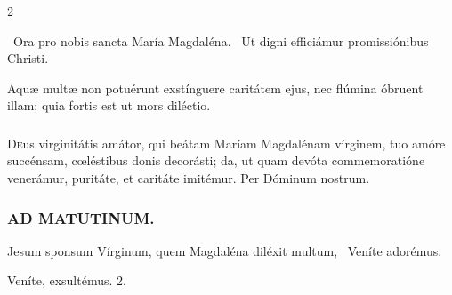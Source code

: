 \documentclass[9pt,twoside]{extarticle}
\begin{document}
\begin{multicols}{2}
{\begin{tightlist}{}
\item {}~Ora pro nobis sancta María Magdaléna. ~Ut digni efficiámur promissiónibus Christi.
\item {} Aquæ multæ non potuérunt exstínguere caritátem ejus, nec flúmina óbruent illam; quia fortis est ut mors diléctio.
\end{tightlist}

\subsubsection*{\center {}}
\lettrine{D}eus virginitátis amátor, qui beátam Maríam Magdalénam vírginem, tuo amóre succénsam, cœléstibus donis decorásti; da, ut quam devóta commemoratióne venerámur, puritáte, et caritáte imitémur. Per Dóminum nostrum.

\subsubsection*{\center \textsc{AD MATUTINUM.}}
\begin{tightlist}{}
\item {} Jesum sponsum Vírginum, quem Magdaléna diléxit multum, \textred{*}~Veníte adorémus.
\item {} Veníte, exsultémus. 2.
\end{tightlist}

}
\end{multicols}
\end{document}
